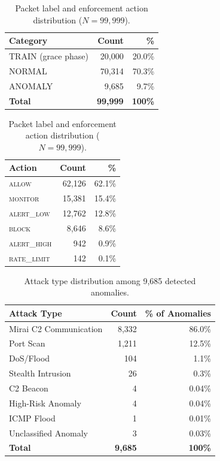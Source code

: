 \documentclass[preprint,12pt,authoryear]{elsarticle}
\begin{document}
\begin{table}[htb]
\caption{Packet label and enforcement action distribution ($N = 99{,}999$).}
\label{tab:label_action}
\centering
\begin{tabular}{lrr}
\toprule
\textbf{Category} & \textbf{Count} & \textbf{\%} \\
\midrule
TRAIN (grace phase) & 20{,}000 & 20.0\% \\
NORMAL              & 70{,}314 & 70.3\% \\
ANOMALY             &  9{,}685 &  9.7\% \\
\midrule
\textbf{Total}      & \textbf{99{,}999} & \textbf{100\%} \\
\bottomrule
\end{tabular}
\vspace{6pt}
\begin{tabular}{lrr}
\toprule
\textbf{Action} & \textbf{Count} & \textbf{\%} \\
\midrule
\textsc{allow}       & 62{,}126 & 62.1\% \\
\textsc{monitor}     & 15{,}381 & 15.4\% \\
\textsc{alert\_low}  & 12{,}762 & 12.8\% \\
\textsc{block}       &  8{,}646 &  8.6\% \\
\textsc{alert\_high} &    942   &  0.9\% \\
\textsc{rate\_limit} &    142   &  0.1\% \\
\bottomrule
\end{tabular}
\end{table}

\begin{table}[htb]
\caption{Attack type distribution among 9{,}685 detected anomalies.}
\label{tab:attack_distribution}
\centering
\begin{tabular}{lrr}
\toprule
\textbf{Attack Type} & \textbf{Count} & \textbf{\% of Anomalies} \\
\midrule
Mirai C2 Communication & 8{,}332 & 86.0\% \\
Port Scan              & 1{,}211 & 12.5\% \\
DoS/Flood              &    104  &  1.1\% \\
Stealth Intrusion      &     26  &  0.3\% \\
C2 Beacon              &      4  &  0.04\% \\
High-Risk Anomaly      &      4  &  0.04\% \\
ICMP Flood             &      1  &  0.01\% \\
Unclassified Anomaly   &      3  &  0.03\% \\
\midrule
\textbf{Total}         & \textbf{9{,}685} & \textbf{100\%} \\
\bottomrule
\end{tabular}
\end{table}
\end{document}
